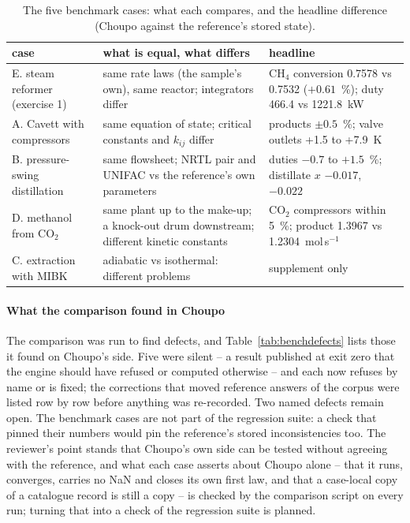 \documentclass[preprint,12pt]{elsarticle}
\begin{document}
\begin{table}[t]
\centering\scriptsize
\caption{The five benchmark cases: what each compares, and the headline
difference (Choupo against the reference's stored state).}
\label{tab:bench}
\begin{tabularx}{\textwidth}{@{}p{2.6cm}p{3.6cm}X@{}}
\toprule
\textbf{case} & \textbf{what is equal, what differs} & \textbf{headline} \\
\midrule
E. steam reformer (exercise 1) & same rate laws (the sample's own), same
  reactor; integrators differ & CH$_4$ conversion 0.7578 vs 0.7532
  ($+0.61$~\%); duty 466.4 vs 1221.8~kW \\
A. Cavett with compressors & same equation of state; critical constants
  and $k_{ij}$ differ & products $\pm0.5$~\%; valve outlets +1.5 to
  +7.9~K \\
B. pressure-swing distillation & same flowsheet; NRTL pair and UNIFAC vs
  the reference's own parameters & duties $-0.7$ to $+1.5$~\%; distillate
  $x$ $-0.017$, $-0.022$ \\
D. methanol from CO$_2$ & same plant up to the make-up; a knock-out drum
  downstream; different kinetic constants & CO$_2$ compressors within
  5~\%; product 1.3967 vs 1.2304~mol\,s$^{-1}$ \\
C. extraction with MIBK & adiabatic vs isothermal: different problems &
  supplement only \\
\bottomrule
\end{tabularx}
\end{table}

\paragraph{What the comparison found in Choupo}  The comparison was run to
find defects, and Table~\ref{tab:benchdefects} lists those it found on
Choupo's side.  Five were silent -- a result published at exit zero that
the engine should have refused or computed otherwise -- and each now
refuses by name or is fixed; the corrections that moved reference answers
of the corpus were listed row by row before anything was re-recorded.  Two
named defects remain open.  The benchmark cases are not part of the
regression suite: a check that pinned their numbers would pin the
reference's stored inconsistencies too.  The reviewer's point stands that
Choupo's own side can be tested without agreeing with the reference, and
what each case asserts about Choupo alone -- that it runs, converges,
carries no NaN and closes its own first law, and that a case-local copy of
a catalogue record is still a copy -- is checked by the comparison script
on every run; turning that into a check of the regression suite is
planned.
\end{document}
